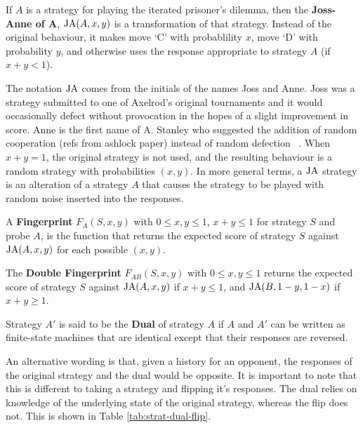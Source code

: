 \begin{definition}\label{def:joss-ann}
If $A$ is a strategy for playing the iterated prisoner's dilemma, then the \textbf{Joss-Anne of A}, $\text{JA}(A, x, y)$ is a transformation of that strategy.
Instead of the original behaviour, it makes move `C' with probablility $x$, move `D' with probability $y$, and otherwise uses the response appropriate to strategy $A$ (if $x+y < 1$).
\end{definition}

The notation $\text{JA}$ comes from the initials of the names Joss and Anne.
Joss was a strategy submitted to one of Axelrod’s original tournaments and it would occasionally defect without provocation in the hopes of a slight improvement in score.
Anne is the first name of A. Stanley who suggested the addition of random cooperation (refs from ashlock paper) instead of random defection ~\cite{Ashlock2008}. %
When $x + y = 1$, the original strategy is not used, and the resulting behaviour is a random strategy with probabilities $(x, y)$.
In more general terms, a $\text{JA}$ strategy is an alteration of a strategy $A$ that causes the strategy to be played with random noise inserted into the responses.

\begin{definition}\label{def:fingerprint}
A \textbf{Fingerprint} $F_A(S, x, y)$ with $0 \leq x, y \leq 1$, $x+y \leq 1$ for strategy $S$ and probe $A$, is the function that returns the expected score of strategy $S$ against $\text{JA}(A, x, y)$ for each possible $(x, y)$.
\end{definition}


\begin{definition}\label{def:double-fingerprint}
The \textbf{Double Fingerprint} $F_{AB}(S, x, y)$ with $0 \leq x, y \leq 1$ returns the expected score of strategy $S$ against $\text{JA}(A, x, y)$ if $x+y \leq 1$, and $\text{JA}(B, 1-y, 1-x)$ if $x+y \geq 1$.
\end{definition}


\begin{definition}\label{def:dual}
Strategy $A'$ is said to be the \textbf{Dual} of strategy $A$ if $A$ and $A'$ can be written as finite-state machines that are identical except that their responses are reversed.
\end{definition}

An alternative wording is that, given a history for an opponent, the responses of the original strategy and the dual would be opposite.
It is important to note that this is different to taking a strategy and flipping it's responses.
The dual relies on knowledge of the underlying state of the original strategy, whereas the flip does not.
This is shown in Table \ref{tab:strat-dual-flip}.

